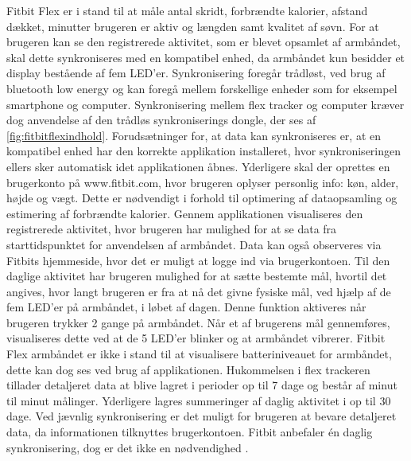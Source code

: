 Fitbit Flex er i stand til at måle antal skridt, forbrændte kalorier, afstand dækket, minutter brugeren er aktiv og længden samt kvalitet af søvn. 
For at brugeren kan se den registrerede aktivitet, som er blevet opsamlet af armbåndet, skal dette synkroniseres med en kompatibel enhed, da armbåndet kun besidder et display bestående af fem LED'er. %
Synkronisering foregår trådløst, ved brug af bluetooth low energy og kan foregå mellem forskellige enheder som for eksempel smartphone og computer. 
Synkronisering mellem flex tracker og computer kræver dog anvendelse af den trådløs synkroniserings dongle, der ses af \autoref{fig:fitbitflexindhold}.
Forudsætninger for, at data kan synkroniseres er, at en kompatibel enhed har den korrekte applikation installeret, hvor synkroniseringen ellers sker automatisk idet applikationen åbnes.  
Yderligere skal der oprettes en brugerkonto på www.fitbit.com, hvor brugeren oplyser personlig info: køn, alder, højde og vægt. Dette er nødvendigt i forhold til optimering af dataopsamling og estimering af forbrændte kalorier.  
Gennem applikationen visualiseres den registrerede aktivitet, hvor brugeren har mulighed for at se data fra starttidspunktet for anvendelsen af armbåndet. Data kan også observeres via  Fitbits hjemmeside, hvor det er muligt at logge ind via brugerkontoen. 
Til den daglige aktivitet har brugeren mulighed for at sætte bestemte mål, hvortil det angives, hvor langt brugeren er fra at nå det givne fysiske mål, ved hjælp af de fem LED'er på armbåndet, i løbet af dagen. Denne funktion aktiveres når brugeren trykker 2 gange på armbåndet. 
Når et af brugerens mål gennemføres, visualiseres dette ved at de 5 LED'er blinker og at armbåndet vibrerer. 
Fitbit Flex armbåndet er ikke i stand til at visualisere batteriniveauet for armbåndet, dette kan dog ses ved brug af applikationen. 
Hukommelsen i flex trackeren tillader detaljeret data at blive lagret i perioder op til 7 dage og består af minut til minut målinger.  
Yderligere lagres summeringer af daglig aktivitet i op til 30 dage. 
Ved jævnlig synkronisering er det muligt for brugeren at bevare detaljeret data, da informationen tilknyttes brugerkontoen. 
Fitbit anbefaler én daglig synkronisering, dog er det ikke en nødvendighed \citep{fitbitflex}. 

